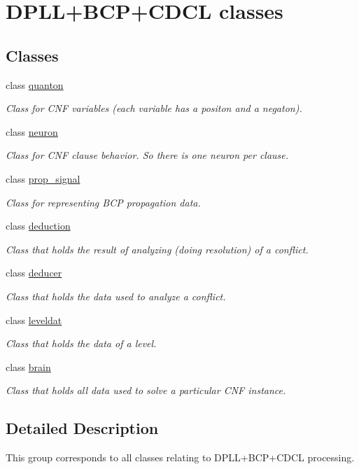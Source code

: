 \hypertarget{group__docgrp___c_d_c_l__classes}{\section{D\+P\+L\+L+\+B\+C\+P+\+C\+D\+C\+L classes}
\label{group__docgrp___c_d_c_l__classes}
}
\subsection*{Classes}
\begin{DoxyCompactItemize}
\item 
class \hyperlink{classquanton}{quanton}
\begin{DoxyCompactList}\small\item\em Class for C\+N\+F variables (each variable has a positon and a negaton). \end{DoxyCompactList}\item 
class \hyperlink{classneuron}{neuron}
\begin{DoxyCompactList}\small\item\em Class for C\+N\+F clause behavior. So there is one neuron per clause. \end{DoxyCompactList}\item 
class \hyperlink{classprop__signal}{prop\+\_\+signal}
\begin{DoxyCompactList}\small\item\em Class for representing B\+C\+P propagation data. \end{DoxyCompactList}\item 
class \hyperlink{classdeduction}{deduction}
\begin{DoxyCompactList}\small\item\em Class that holds the result of analyzing (doing resolution) of a conflict. \end{DoxyCompactList}\item 
class \hyperlink{classdeducer}{deducer}
\begin{DoxyCompactList}\small\item\em Class that holds the data used to analyze a conflict. \end{DoxyCompactList}\item 
class \hyperlink{classleveldat}{leveldat}
\begin{DoxyCompactList}\small\item\em Class that holds the data of a level. \end{DoxyCompactList}\item 
class \hyperlink{classbrain}{brain}
\begin{DoxyCompactList}\small\item\em Class that holds all data used to solve a particular C\+N\+F instance. \end{DoxyCompactList}\end{DoxyCompactItemize}


\subsection{Detailed Description}
This group corresponds to all classes relating to D\+P\+L\+L+\+B\+C\+P+\+C\+D\+C\+L processing. 